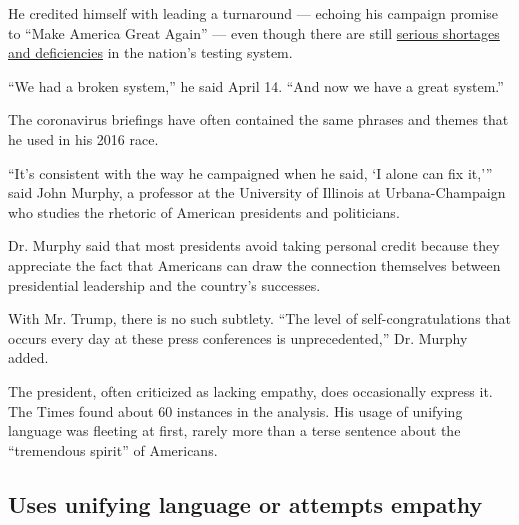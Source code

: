 He credited himself with leading a turnaround --- echoing his campaign
promise to ``Make America Great Again'' --- even though there are still
\href{https://www.nytimes.com/2020/04/15/us/coronavirus-testing-trump.html}{serious
shortages and deficiencies} in the nation's testing system.

``We had a broken system,'' he said April 14. ``And now we have a great
system.''

The coronavirus briefings have often contained the same phrases and
themes that he used in his 2016 race.

``It's consistent with the way he campaigned when he said, `I alone can
fix it,''' said John Murphy, a professor at the University of Illinois
at Urbana-Champaign who studies the rhetoric of American presidents and
politicians.

Dr. Murphy said that most presidents avoid taking personal credit
because they appreciate the fact that Americans can draw the connection
themselves between presidential leadership and the country's successes.

With Mr. Trump, there is no such subtlety. ``The level of
self-congratulations that occurs every day at these press conferences is
unprecedented,'' Dr. Murphy added.

The president, often criticized as lacking empathy, does occasionally
express it. The Times found about 60 instances in the analysis. His
usage of unifying language was fleeting at first, rarely more than a
terse sentence about the ``tremendous spirit'' of Americans.

\hypertarget{uses-unifying-language-or-attempts-empathy}{%
\subsection{Uses unifying language or attempts
empathy}\label{uses-unifying-language-or-attempts-empathy}}

